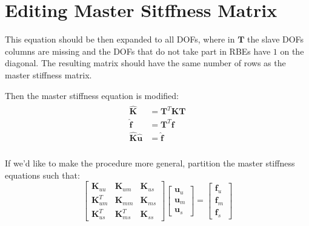\documentclass[10pt,b5paper,titlepage]{book}
\newcommand{\m}{\mathbf}
\newenvironment{eqarray}
{
    \begin{eqnarray}
        \begin{aligned}
}
{
        \end{aligned}
    \end{eqnarray}
}
\begin{document}
\section{Editing Master Sitffness Matrix}

This equation should be then expanded to all DOFs, where in $ \m{T} $ the
slave DOFs columns are missing and the DOFs that do not take part in RBEs have $ 1 $ on
the diagonal. The resulting  matrix should have the same number of rows as
the master stiffness matrix.

Then the master stiffness equation is modified:
\begin{eqarray}\label{rbe2-master-slave-modified}
    \m{\hat{K}} &= \m{T}^T \m{K} \m{T} \\
    \m{\hat{f}} &= \m{T}^T \m{f} \\
    \m{\hat{K}} \m{\hat{u}} &= \m{\hat{f}} \\
\end{eqarray}

If we'd like to make the procedure more general, partition the master stiffness
equations such that:
\begin{equation}
    \begin{bmatrix}
        \m{K}_{uu} & \m{K}_{um} & \m{K}_{us} \\
        \m{K}_{um}^T & \m{K}_{mm} & \m{K}_{ms} \\
        \m{K}_{us}^T & \m{K}_{ms}^T & \m{K}_{ss}
    \end{bmatrix}
    \begin{bmatrix}
        \m{u}_u \\
        \m{u}_m \\
        \m{u}_s
    \end{bmatrix}
    = \begin{bmatrix}
        \m{f}_u \\
        \m{f}_m \\
        \m{f}_s
    \end{bmatrix}
\end{equation}
\end{document}
